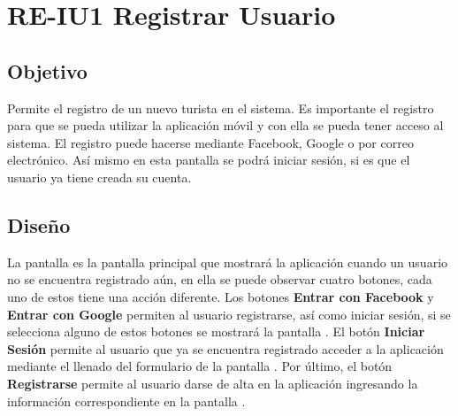 \newpage
\section{RE-IU1 Registrar Usuario}

\subsection{Objetivo}
Permite el registro de un nuevo turista en el sistema. Es importante el registro para que se pueda utilizar la aplicación móvil y con ella se pueda tener acceso al sistema. El registro puede hacerse mediante Facebook, Google o por correo electrónico. Así mismo en esta pantalla se podrá iniciar sesión, si es que el usuario ya tiene creada su cuenta.

\subsection{Diseño}
La pantalla  es la pantalla principal que mostrará la aplicación cuando un usuario no se encuentra registrado aún, en ella se puede observar cuatro botones, cada uno de estos tiene una acción diferente. Los botones \textbf{Entrar con Facebook} y \textbf{Entrar con Google} permiten al usuario registrarse, así como iniciar sesión, si se selecciona alguno de estos botones se mostrará la pantalla . El botón \textbf{Iniciar Sesión} permite al usuario que ya se encuentra registrado acceder a la aplicación mediante el llenado del formulario de la pantalla . Por último, el botón \textbf{Registrarse} permite al usuario darse de alta en la aplicación ingresando la información correspondiente en la pantalla .





